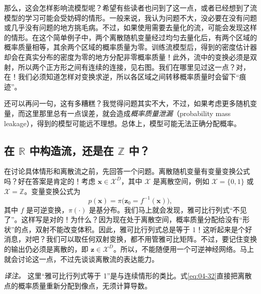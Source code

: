 
那么，这会怎样影响流模型呢？希望有些读者也问到了这一点，或者已经想到了流模型的学习可能会受妨碍的情形。一般来说，我认为问题不大，没必要在没有问题或几乎没有问题的地方挑毛病。不过，如果使用需要去量化的流，可能会发现这样的情形。在这个简单例子中，两个离散随机变量经过均匀去量化后，有两个区域的概率质量相等，其余两个区域的概率质量为零。训练流模型后，得到的密度估计器却会在真实分布的密度为零的地方分配非零概率质量！此外，流中的变换必须是双射，所以两个正方形之间有连续的连接，见右图。我们在哪里见过这一点？对，在！我们必须知道怎样对变换求逆，所以各区域之间转移概率质量时会留下“痕迹”。

还可以再问一句，这有多糟糕？我觉得问题其实不大，不过，如果考虑更多随机变量，而这里那里总有一点误差，就会造成\emph{概率质量泄漏}（probability mass leakage），得到的模型可能远不理想。总体上，模型可能无法正确分配概率。

\subsection[实数空间的流还是整数空间的流？]{在 $\mathbb{R}$ 中构造流，还是在 $\mathbb{Z}$ 中？}

在讨论具体情形和离散流之前，先回答一个问题。离散随机变量有变量变换公式吗？好在答案是肯定的！考虑 $\mathbf{x}\in\mathcal{X}^D$，其中 $\mathcal{X}$ 是离散空间，例如 $\mathcal{X}=\{0,1\}$ 或 $\mathcal{X}=\mathbb{Z}$。变量变换公式为
\begin{equation}
p(\mathbf{x})=\pi\bigl(\mathbf{z}_0=f^{-1}(\mathbf{x})\bigr),
\tag{4.32}\label{eq:04-32}
\end{equation}
其中 $f$ 是可逆变换，$\pi(\cdot)$ 是基分布。我们马上就会发现，雅可比行列式“不见了”。这样写是对的！为什么？因为现在处于离散空间，概率质量分配给没有“形状”的点，双射不能改变体积。因此，雅可比行列式总是等于 1！这听起来是个好消息，对吧？我们可以取任何双射变换，都不用管雅可比矩阵。不过，要记住变换的输出仍必须是离散的，即 $\mathbf{z}\in\mathcal{X}^D$。所以，不能随便用一个可逆神经网络。马上就会讨论这一点，不过先谈谈离散流的表达能力。

\emph{译注。} 这里“雅可比行列式等于 1”是与连续情形的类比。式\eqref{eq:04-32}直接把离散点的概率质量重新分配到像点，无须计算导数。

